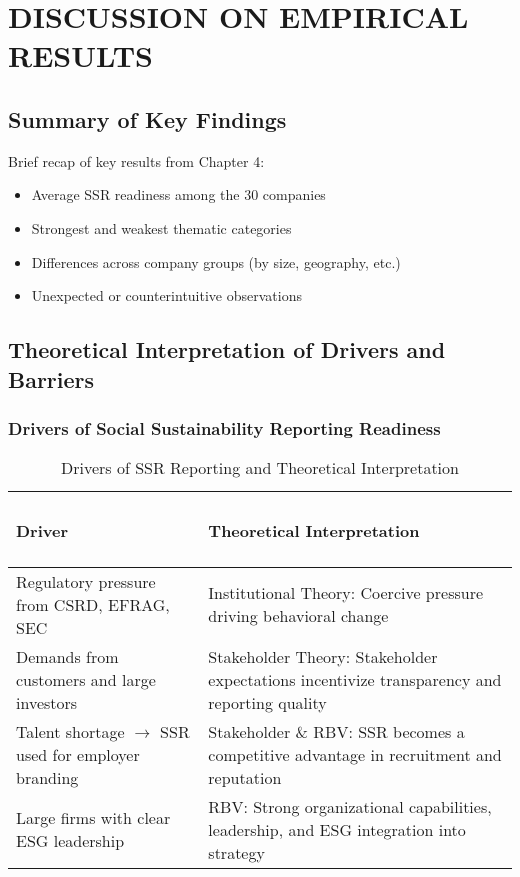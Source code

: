 \chapter{DISCUSSION ON EMPIRICAL RESULTS}

\section{Summary of Key Findings}
Brief recap of key results from Chapter 4:
\begin{itemize}
    \item Average SSR readiness among the 30 companies
    \item Strongest and weakest thematic categories
    \item Differences across company groups (by size, geography, etc.)
    \item Unexpected or counterintuitive observations
\end{itemize}

\section{Theoretical Interpretation of Drivers and Barriers}
\subsection{Drivers of Social Sustainability Reporting Readiness}

\begin{table}[H]
    \centering
    \caption{Drivers of SSR Reporting and Theoretical Interpretation}
    \begin{tabular}{p{6cm}|p{8cm}}
        \subsubsection{Driver} & \subsubsection{Theoretical Interpretation} \\
        \hline
        Regulatory pressure from CSRD, EFRAG, SEC & Institutional Theory: Coercive pressure driving behavioral change \\
        \hline
        Demands from customers and large investors & Stakeholder Theory: Stakeholder expectations incentivize transparency and reporting quality \\
        \hline
        Talent shortage $\rightarrow$ SSR used for employer branding & Stakeholder \& RBV: SSR becomes a competitive advantage in recruitment and reputation \\
        \hline
        Large firms with clear ESG leadership & RBV: Strong organizational capabilities, leadership, and ESG integration into strategy    
    \end{tabular}
\end{table}

